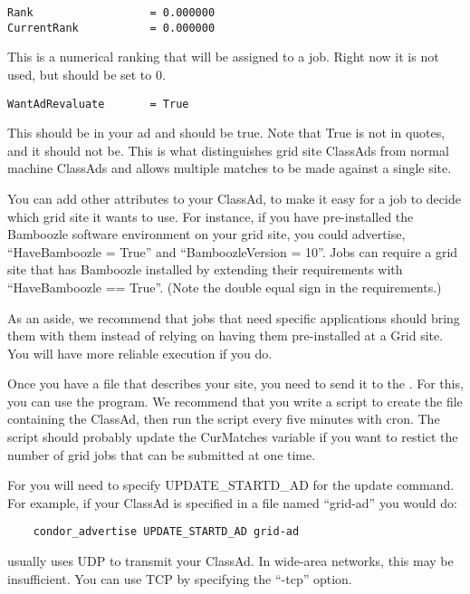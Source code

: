 \begin{verbatim}
Rank                  = 0.000000
CurrentRank           = 0.000000
\end{verbatim}

This is a numerical ranking that will be assigned to a job. Right now
it is not used, but should be set to 0. 

\begin{verbatim}
WantAdRevaluate       = True
\end{verbatim}

This should be in your ad and should be true. Note that True is not in
quotes, and it should not be. This is what distinguishes grid site
ClassAds from normal machine ClassAds and allows multiple matches to
be made against a single site. 

You can add other attributes to your ClassAd, to make it easy for a
job to decide which grid site it wants to use. For instance, if you
have pre-installed the Bamboozle software environment on your grid
site, you could advertise, ``HaveBamboozle = True'' and
``BamboozleVersion = 10''. Jobs can require a grid site that has
Bamboozle installed by extending their requirements with
``HaveBamboozle == True''. (Note the double equal sign in the
requirements.) 

As an aside, we recommend that jobs that need specific applications
should bring them with them instead of relying on having them
pre-installed at a Grid site. You will have more reliable execution if
you do. 

Once you have a file that describes your site, you need to send it to
the . For this, you can use the 
program. We recommend that you write a script to create the file
containing the ClassAd, then run the script every five minutes with
cron. The script should probably update the CurMatches variable if you
want to restict the number of grid jobs that can be submitted at one
time. 

For  you will need to specify UPDATE\_STARTD\_AD for
the update command. For example, if your ClassAd is specified in a
file named ``grid-ad'' you would do:

\begin{verbatim}
    condor_advertise UPDATE_STARTD_AD grid-ad
\end{verbatim}

 usually uses UDP to transmit your ClassAd. In
wide-area networks, this may be insufficient. You can use TCP by
specifying the ``-tcp'' option. 

